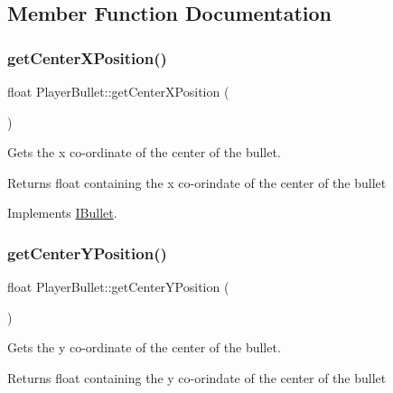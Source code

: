 \subsection{Member Function Documentation}
\mbox{\label{class_player_bullet_a73c27dca47ea3fdcecd82ce4b2089c4a}} 
\subsubsection{\texorpdfstring{get\+Center\+X\+Position()}{getCenterXPosition()}}
{\footnotesize\ttfamily float Player\+Bullet\+::get\+Center\+X\+Position (\begin{DoxyParamCaption}{ }\end{DoxyParamCaption})\hspace{0.3cm}{\ttfamily [virtual]}}



Gets the x co-\/ordinate of the center of the bullet. 

\begin{DoxyReturn}{Returns}
float containing the x co-\/orindate of the center of the bullet 
\end{DoxyReturn}


Implements \hyperlink{class_i_bullet}{I\+Bullet}.

\mbox{\label{class_player_bullet_a7ad2bc922595b9a11373fd42666926ef}} 
\subsubsection{\texorpdfstring{get\+Center\+Y\+Position()}{getCenterYPosition()}}
{\footnotesize\ttfamily float Player\+Bullet\+::get\+Center\+Y\+Position (\begin{DoxyParamCaption}{ }\end{DoxyParamCaption})\hspace{0.3cm}{\ttfamily [virtual]}}



Gets the y co-\/ordinate of the center of the bullet. 

\begin{DoxyReturn}{Returns}
float containing the y co-\/orindate of the center of the bullet 
\end{DoxyReturn}


